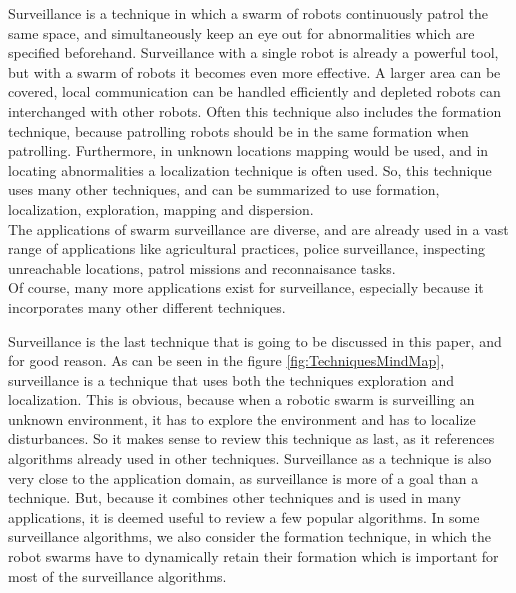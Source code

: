 
Surveillance is a technique in which a swarm of robots continuously patrol the same space, and simultaneously keep an eye out for abnormalities which are specified beforehand. 
Surveillance with a single robot is already a powerful tool, but with a swarm of robots it becomes even more effective. 
A larger area can be covered, local communication can be handled efficiently and depleted robots can interchanged with other robots. 
Often this technique also includes the formation technique, because patrolling robots should be in the same formation when patrolling. 
Furthermore, in unknown locations mapping would be used, and in locating abnormalities a localization technique is often used.
So, this technique uses many other techniques, and can be summarized to use formation, localization, exploration, mapping and dispersion.  \\

The applications of swarm surveillance are diverse, and are already used in a vast range of applications like agricultural practices, police surveillance, inspecting unreachable locations, patrol missions and reconnaisance tasks. \cite{Burkle2010} \\
Of course, many more applications exist for surveillance, especially because it incorporates many other different techniques. 


Surveillance is the last technique that is going to be discussed in this paper, and for good reason. 
As can be seen in the figure \ref{fig:TechniquesMindMap}, surveillance is a technique that uses both the techniques exploration and localization.
This is obvious, because when a robotic swarm is surveilling an unknown environment, it has to explore the environment and has to localize disturbances.
So it makes sense to review this technique as last, as it references algorithms already used in other techniques.  
Surveillance as a technique is also very close to the application domain, as surveillance is more of a goal than a technique. 
But, because it combines other techniques and is used in many applications, it is deemed useful to review a few popular algorithms. 
In some surveillance algorithms, we also consider the formation technique, in which the robot swarms have to dynamically retain their formation which is important for most of the surveillance algorithms. 

